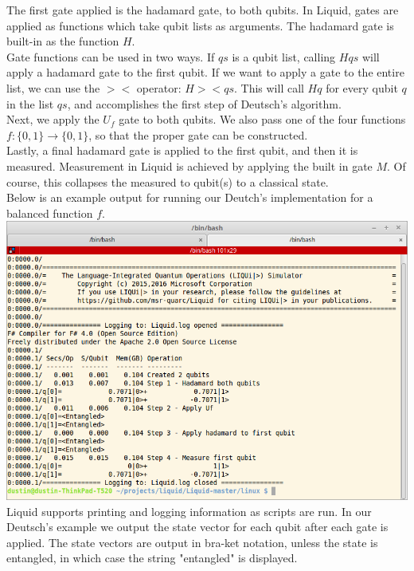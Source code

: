 \documentclass{article}
\theoremstyle{plain}
\theoremstyle{definition}
\theoremstyle{remark}
\begin{document}
The first gate applied is the hadamard gate, to both qubits. In Liquid, gates are applied
as functions which take qubit lists as arguments. The hadamard gate is built-in as the function $H$.\\

Gate functions can be used in two ways. If $qs$ is a qubit list, calling $H qs$ will apply
a hadamard gate to the first qubit. If we want to apply a gate to the entire list, we can use the
$><$ operator: $H >< qs$. This will call $H q$ for every qubit $q$ in the list $qs$, and accomplishes
the first step of Deutsch's algorithm. \\

Next, we apply the $U_f$ gate to both qubits. We also pass one of the four functions $f: \{0,1\} \rightarrow \{0,1\}$,
so that the proper gate can be constructed. \\

Lastly, a final hadamard gate is applied to the first qubit, and then it is measured. Measurement in Liquid is
achieved by applying the built in gate $M$. Of course, this collapses the measured to qubit(s) to a classical state. \\



Below is an example output for running our Deutch's implementation for a balanced function $f$.\\
\includegraphics[scale=.45]{deutsch_screen} \\

Liquid supports printing and logging information as scripts are run. In our Deutsch's example we output the state vector
for each qubit after each gate is applied. The state vectors are output in bra-ket notation, unless the state is entangled,
in which case the string "entangled" is displayed. \\
\end{document}
